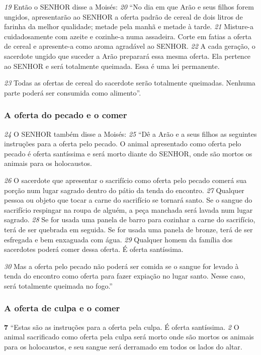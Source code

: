 \bigskip
\textit{\tiny 19}
Então o SENHOR disse a Moisés: 
\textit{\tiny 20}
“No dia em que Arão e seus filhos forem
ungidos, apresentarão ao SENHOR a oferta padrão de cereal de dois litros de
farinha da melhor qualidade; metade pela manhã e metade à tarde. 
\textit{\tiny 21}
Misture-a
cuidadosamente com azeite e cozinhe-a numa assadeira. Corte em fatias a oferta
de cereal e apresente-a como aroma agradável ao SENHOR. 
\textit{\tiny 22}
A cada geração, o
sacerdote ungido que suceder a Arão preparará essa mesma oferta. Ela pertence
ao SENHOR e será totalmente queimada. Essa é uma lei permanente. 

\smallskip
\textit{\tiny 23}
Todas as
ofertas de cereal do sacerdote serão totalmente queimadas. Nenhuma parte
poderá ser consumida como alimento”.

\bigskip
\subsubsection*{A oferta do pecado e o comer}  
\textit{\tiny 24}
O SENHOR também disse a Moisés: 
\textit{\tiny 25}
“Dê a Arão e a seus filhos as seguintes
instruções para a oferta pelo pecado. O animal apresentado como oferta pelo
pecado é oferta santíssima e será morto diante do SENHOR, onde são mortos os
animais para os holocaustos. 

\smallskip
\textit{\tiny 26}
O sacerdote que apresentar o sacrifício como
oferta pelo pecado comerá sua porção num lugar sagrado dentro do pátio da
tenda do encontro. 
\textit{\tiny 27}
Qualquer pessoa ou objeto que tocar a carne do sacrifício se
tornará santo. Se o sangue do sacrifício respingar na roupa de alguém, a peça
manchada será lavada num lugar sagrado. 
\textit{\tiny 28}
Se for usada uma panela de barro
para cozinhar a carne do sacrifício, terá de ser quebrada em seguida. Se for usada
uma panela de bronze, terá de ser esfregada e bem enxaguada com água.
\textit{\tiny 29}
Qualquer homem da família dos sacerdotes poderá comer dessa oferta. É oferta
santíssima. 

\smallskip
\textit{\tiny 30}
Mas a oferta pelo pecado não poderá ser comida se o sangue for
levado à tenda do encontro como oferta para fazer expiação no lugar santo. Nesse
caso, será totalmente queimada no fogo.”
   
\bigskip
\subsubsection*{A oferta de culpa e o comer}  
\textbf{\large 7} “Estas são as instruções para a oferta pela culpa. É oferta santíssima. 
\textit{\tiny 2} 
O animal sacrificado como oferta pela culpa será morto onde são mortos os animais
para os holocaustos, e seu sangue será derramado em todos os lados do altar. 

